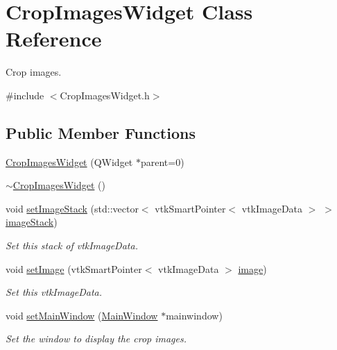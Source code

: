 \hypertarget{class_crop_images_widget}{\section{Crop\-Images\-Widget Class Reference}
\label{d0/d3c/class_crop_images_widget}
}


Crop images.  




{\ttfamily \#include $<$Crop\-Images\-Widget.\-h$>$}

\subsection*{Public Member Functions}
\begin{DoxyCompactItemize}
\item 
\hyperlink{class_crop_images_widget_aae1d29894906efd2551175b48d063132}{Crop\-Images\-Widget} (Q\-Widget $\ast$parent=0)
\item 
\hyperlink{class_crop_images_widget_ac8d6f0816d821f23169f8a64e36e1cf4}{$\sim$\-Crop\-Images\-Widget} ()
\item 
void \hyperlink{class_crop_images_widget_a5313314b9fc24e002b8af6ecf4e4fda5}{set\-Image\-Stack} (std\-::vector$<$ vtk\-Smart\-Pointer$<$ vtk\-Image\-Data $>$ $>$ \hyperlink{class_crop_images_widget_a924d245cce06a0c16d6c4bd8a3762a67}{image\-Stack})
\begin{DoxyCompactList}\small\item\em Set this stack of vtk\-Image\-Data. \end{DoxyCompactList}\item 
void \hyperlink{class_crop_images_widget_a3d703f7443ec0b8143a8422ccd53661d}{set\-Image} (vtk\-Smart\-Pointer$<$ vtk\-Image\-Data $>$ \hyperlink{class_crop_images_widget_ab160815d191ed30e0c6b8a905818ab3b}{image})
\begin{DoxyCompactList}\small\item\em Set this vtk\-Image\-Data. \end{DoxyCompactList}\item 
void \hyperlink{class_crop_images_widget_a5c67bd8dc0159deaac57a58c6182efa9}{set\-Main\-Window} (\hyperlink{class_main_window}{Main\-Window} $\ast$mainwindow)
\begin{DoxyCompactList}\small\item\em Set the window to display the crop images. \end{DoxyCompactList}\end{DoxyCompactItemize}
